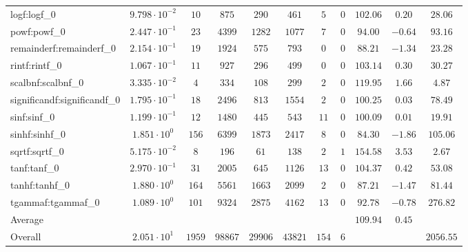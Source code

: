 \begin{tabular}{|l|c|c|c|c|c|c|c|c|c|c|}
logf:logf\_0                 & $ 9.798 \cdot 10^{-2} $ & $ 10     $ & $ 875   $ & $ 290   $ & $ 461   $ & $ 5   $ & $ 0 $ & $ 102.06      $ & $ 0.20    $ & $ 28.06   $ \\
powf:powf\_0                 & $ 2.447 \cdot 10^{-1} $ & $ 23     $ & $ 4399  $ & $ 1282  $ & $ 1077  $ & $ 7   $ & $ 0 $ & $ 94.00       $ & $ -0.64   $ & $ 93.16   $ \\
remainderf:remainderf\_0     & $ 2.154 \cdot 10^{-1} $ & $ 19     $ & $ 1924  $ & $ 575   $ & $ 793   $ & $ 0   $ & $ 0 $ & $ 88.21       $ & $ -1.34   $ & $ 23.28   $ \\
rintf:rintf\_0               & $ 1.067 \cdot 10^{-1} $ & $ 11     $ & $ 927   $ & $ 296   $ & $ 499   $ & $ 0   $ & $ 0 $ & $ 103.14      $ & $ 0.30    $ & $ 30.27   $ \\
scalbnf:scalbnf\_0           & $ 3.335 \cdot 10^{-2} $ & $ 4      $ & $ 334   $ & $ 108   $ & $ 299   $ & $ 2   $ & $ 0 $ & $ 119.95      $ & $ 1.66    $ & $ 4.87    $ \\
significandf:significandf\_0 & $ 1.795 \cdot 10^{-1} $ & $ 18     $ & $ 2496  $ & $ 813   $ & $ 1554  $ & $ 2   $ & $ 0 $ & $ 100.25      $ & $ 0.03    $ & $ 78.49   $ \\
sinf:sinf\_0                 & $ 1.199 \cdot 10^{-1} $ & $ 12     $ & $ 1480  $ & $ 445   $ & $ 543   $ & $ 11  $ & $ 0 $ & $ 100.09      $ & $ 0.01    $ & $ 19.91   $ \\
sinhf:sinhf\_0               & $ 1.851 \cdot 10^{0}  $ & $ 156    $ & $ 6399  $ & $ 1873  $ & $ 2417  $ & $ 8   $ & $ 0 $ & $ 84.30       $ & $ -1.86   $ & $ 105.06  $ \\
sqrtf:sqrtf\_0               & $ 5.175 \cdot 10^{-2} $ & $ 8      $ & $ 196   $ & $ 61    $ & $ 138   $ & $ 2   $ & $ 1 $ & $ 154.58      $ & $ 3.53    $ & $ 2.67    $ \\
tanf:tanf\_0                 & $ 2.970 \cdot 10^{-1} $ & $ 31     $ & $ 2005  $ & $ 645   $ & $ 1126  $ & $ 13  $ & $ 0 $ & $ 104.37      $ & $ 0.42    $ & $ 53.08   $ \\
tanhf:tanhf\_0               & $ 1.880 \cdot 10^{0}  $ & $ 164    $ & $ 5561  $ & $ 1663  $ & $ 2099  $ & $ 2   $ & $ 0 $ & $ 87.21       $ & $ -1.47   $ & $ 81.44   $ \\
tgammaf:tgammaf\_0           & $ 1.089 \cdot 10^{0}  $ & $ 101    $ & $ 9324  $ & $ 2875  $ & $ 4162  $ & $ 13  $ & $ 0 $ & $ 92.78       $ & $ -0.78   $ & $ 276.82  $ \\
\hline
Average                      & $                     $ & $        $ & $       $ & $       $ & $       $ & $     $ & $   $ & $ 109.94      $ & $ 0.45    $ & $         $ \\
\hline
Overall                      & $ 2.051 \cdot 10^{1}  $ & $ 1959   $ & $ 98867 $ & $ 29906 $ & $ 43821 $ & $ 154 $ & $ 6 $ & $             $ & $         $ & $ 2056.55 $ \\
\hline
\end{tabular}

